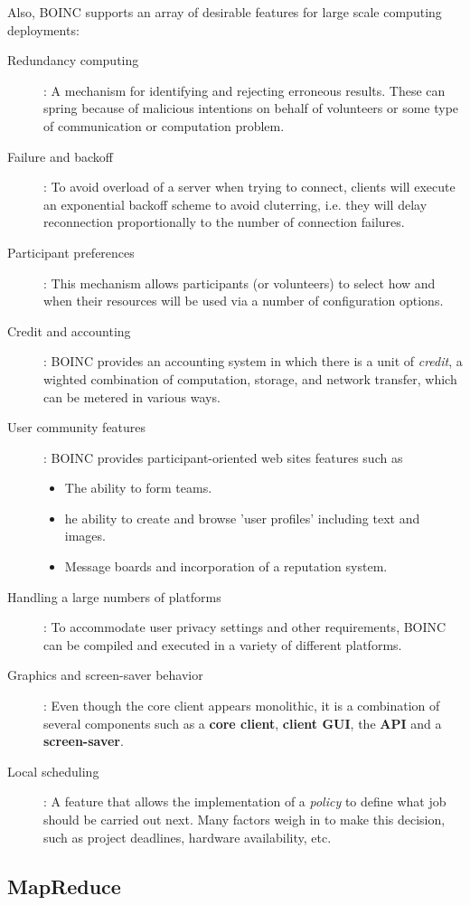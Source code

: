 \documentclass[a4paper,12pt,english]{report}
\begin{document}
Also, BOINC supports an array of desirable features for large scale computing deployments\cite{boinc1}:
\begin{description}
\item [Redundancy computing]: A mechanism for identifying and rejecting erroneous results. These can spring because of malicious intentions on behalf of volunteers or some type of communication or computation problem.
\item [Failure and backoff]: To avoid overload of a server when trying to connect, clients will execute an exponential backoff scheme to avoid cluterring, i.e. they will delay reconnection proportionally to the number of connection failures.
\item [Participant preferences]: This mechanism allows participants (or volunteers) to select how and when their resources will be used via a number of configuration options.
\item [Credit and accounting]: BOINC provides an accounting system in which there is a unit of \emph{credit}, a wighted combination of computation, storage, and network transfer, which can be metered in various ways.
\item [User community features]: BOINC provides participant-oriented web sites features such as
\begin{itemize}
 \item The ability to form teams.
 \item he ability to create and browse 'user profiles' including text and images.
 \item Message boards and incorporation of a reputation system.
\end{itemize}
\item [Handling a large numbers of platforms]: To accommodate user privacy settings and other requirements, BOINC can be compiled and executed in a variety of different platforms.
\item [Graphics and screen-saver behavior]: Even though the core client appears monolithic, it is a combination of several components such as a \textbf{core client}, \textbf{client GUI}, the \textbf{API} and a \textbf{screen-saver}.
\item [Local scheduling]: A feature that allows the implementation of a \emph{policy} to define what job should be carried out next. Many factors weigh in to make this decision, such as project deadlines, hardware availability, etc.
\end{description}


\subsection{MapReduce}
\end{document}
